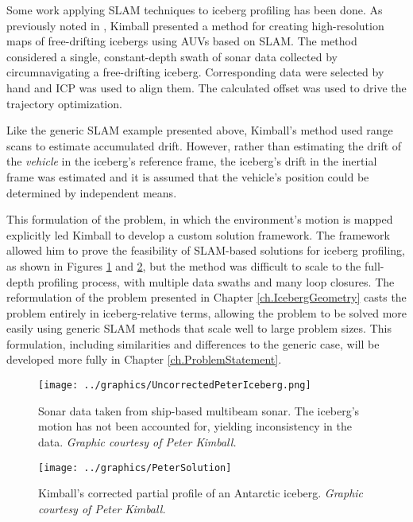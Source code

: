 Some work applying SLAM techniques to iceberg profiling has been done. As previously noted in \cite{Kimball2011b}, Kimball presented a method for creating high-resolution maps of free-drifting icebergs using AUVs based on SLAM. The method considered a single, constant-depth swath of sonar data collected by circumnavigating a free-drifting iceberg. Corresponding data were selected by hand and ICP was used to align them. The calculated offset was used to drive the trajectory optimization.

Like the generic SLAM example presented above, Kimball's method used range scans to estimate accumulated drift. However, rather than estimating the drift of the \emph{vehicle} in the iceberg's reference frame, the iceberg's drift in the inertial frame was estimated and it is assumed that the vehicle's position could be determined by independent means.  

This formulation of the problem, in which the environment's motion is mapped explicitly led Kimball to develop a custom solution framework. The framework allowed him to prove the feasibility of SLAM-based solutions for iceberg profiling, as shown in Figures \ref{fig:KimballPreSolution} and \ref{fig:KimballSolution}, but the method was difficult to scale to the full-depth profiling process, with multiple data swaths and many loop closures. The reformulation of the problem presented in Chapter \ref{ch.IcebergGeometry} casts the problem entirely in iceberg-relative terms, allowing the problem to be solved more easily using generic SLAM methods that scale well to large problem sizes. This formulation, including similarities and differences to the generic case, will be developed more fully in Chapter \ref{ch.ProblemStatement}.

 \begin{figure}[!htb]
   \centering
   \texttt{[image: ../graphics/UncorrectedPeterIceberg.png]} %
   \caption{Sonar data taken from ship-based multibeam sonar. The iceberg's motion has not been accounted for, yielding inconsistency in the data. \emph{Graphic courtesy of Peter Kimball.}}
   \label{fig:KimballPreSolution}
\end{figure}

 \begin{figure}[!htb]
   \centering
   \texttt{[image: ../graphics/PeterSolution]} %
   \caption{Kimball's corrected partial profile of an Antarctic iceberg. \emph{Graphic courtesy of Peter Kimball.}}
   \label{fig:KimballSolution}
\end{figure}

